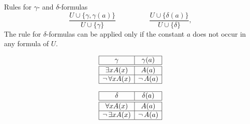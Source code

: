 \documentclass[style=simple,size=12pt]{powerdot}
\begin{document}
\begin{wideslide}[bm=,toc=]{Rules for $\gamma$- and $\delta$-formulas}
\begin{displaymath}
\frac{U\cup \{\gamma, \gamma(a)\}}{U\cup\{\gamma\}} \hspace{2cm}
\frac{U\cup\{\delta(a)\}}{U\cup\{\delta\}},
\end{displaymath}
The rule for $\delta$-formulas can be applied only if the constant $a$
does not occur in any formula of $U$.

\begin{center}
\begin{minipage}[t]{0.45\textwidth}
\minisp
\begin{displaymath}
\begin{array}{|c|c|}
\hline
\gamma & \gamma(a)  \\ \hline \hline
\exists xA(x) & A(a) \\ \hline
\mathop{\neg} \forall xA(x) & \mathop{\neg} A(a) \\ \hline
\end{array}
\end{displaymath}
\end{minipage}
\begin{minipage}[t]{0.45\textwidth}
\minisp
\begin{displaymath}
\begin{array}{|c|c|}
\hline
\delta & \delta(a)  \\ \hline \hline
\forall xA(x) & A(a) \\ \hline
\mathop{\neg} \exists xA(x) & \mathop{\neg} A(a) \\ \hline
\end{array}
\end{displaymath}
\end{minipage}
\end{center}
\end{wideslide}
\end{document}
